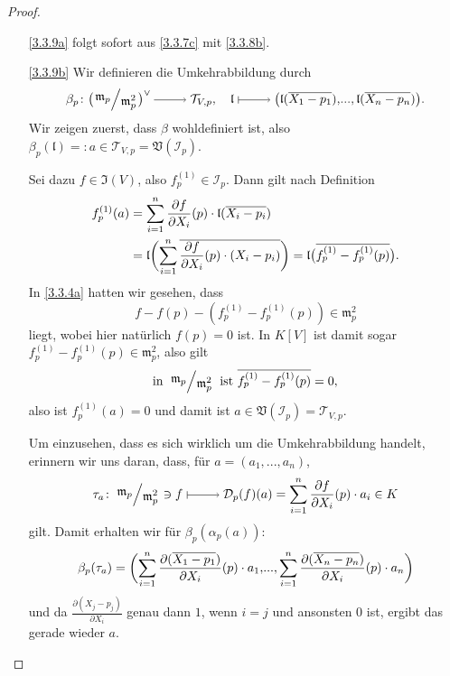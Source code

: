 \documentclass[a4paper,12pt,index=toc]{scrbook}
\theoremstyle{keinenummern} %
\def\V{\mathfrak{V}}
\def\I{\mathfrak{I}}
\def\II{\mathcal{I}}
\newcommand{\DD}{\mathcal{D}} %
\def\l{\mathfrak{l}}
\def\T{\mathcal{T}}
\def\m{\mathfrak{m}}
\renewcommand{\dotsc}{\ensuremath{\!...}}
\def\Bar#1{\ensuremath\overline{#1}}
\begin{document}
\begin{proof}\begin{enumerate}
\item[\ref{3.3.9a}] folgt sofort aus \cref{3.3.7c} mit \cref{3.3.8b}.
\item[\ref{3.3.9b}] Wir definieren die Umkehrabbildung durch
\begin{equation*}\beta_{p}\colon\bigl(\Quotient{\m_{p}}{\m_{p}^{2}}\bigr)^{\vee}\ra\T_{V,p},\quad\l\mapsto\bigl(\l(\Bar{X_{1}-p_{1}}),\dotsc,\l(\Bar{X_{n}-p_{n}})\bigr).\end{equation*}
Wir zeigen zuerst, dass $\beta$ wohldefiniert ist, also $\beta_{p}(\l)=:a\in\T_{V,p}=\V(\II_{p})$.

Sei dazu $f\in\I(V)$, also $f_{p}^{(1)}\in\II_{p}$. Dann gilt nach Definition
\begin{align*}
f_{p}^{(1)}(a)&=\sum_{i=1}^{n}\frac{\partial f}{\partial X_{i}}(p)\cdot\l(\Bar{X_{i}-p_{i}})\\
&=\l\biggl(\sum_{i=1}^{n}\Bar{\frac{\partial f}{\partial X_{i}}(p)\cdot(X_{i}-p_{i})}\biggr)=\l\bigl(\Bar{f_{p}^{(1)}-f_{p}^{(1)}(p)}\bigr).
\end{align*}
In \cref{3.3.4a} hatten wir gesehen, dass
\begin{equation*}f-f(p)-(f_{p}^{(1)}-f_{p}^{(1)}(p))\in\m_{p}^{2}\end{equation*}
liegt, wobei hier natürlich $f(p)=0$ ist. In $K[V]$ ist damit sogar $f_{p}^{(1)}-f_{p}^{(1)}(p)\in\m_{p}^{2}$, also gilt 
\begin{equation*}\text{in }\Quotient{\m_{p}}{\m_{p}^{2}}\text{ ist }\Bar{f_{p}^{(1)}-f_{p}^{(1)}(p)}=0,\end{equation*}
also ist $f_{p}^{(1)}(a)=0$ und damit ist $a\in\V(\II_{p})=\T_{V,p}$.

Um einzusehen, dass es sich wirklich um die Umkehrabbildung handelt, erinnern wir uns daran, dass, für $a=(a_{1},\dotsc,a_{n})$,
\begin{equation*}\tau_{a}\colon \Quotient{\m_{p}}{\m_{p}^{2}}\ni f\mapsto\DD_{p}(f)(a)=\sum_{i=1}^{n}\frac{\partial f}{\partial X_{i}}(p)\cdot a_{i}\in K\end{equation*}
gilt. Damit erhalten wir für $\beta_{p}(\alpha_{p}(a))$:
\begin{equation*}\beta_{p}(\tau_{a})=\biggl(\sum_{i=1}^{n}\frac{\partial (\Bar{X_{1}-p_{1}})}{\partial X_{i}}(p)\cdot a_{1},\dotsc,\sum_{i=1}^{n}\frac{\partial (\Bar{X_{n}-p_{n}})}{\partial X_{i}}(p)\cdot a_{n}\biggr)\end{equation*}
und da $\frac{\partial (X_{j}-p_{j})}{\partial X_{i}}$ genau dann $1$, wenn $i=j$ und ansonsten $0$ ist, ergibt das gerade wieder $a$.


\end{enumerate}
\end{proof}
\end{document}
